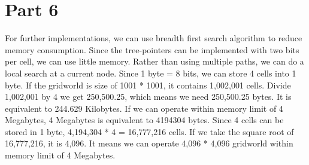 \documentclass{article}
\begin{document}
\section*{Part 6}
\hspace{5mm}
For further implementations, we can use breadth first search algorithm to reduce memory consumption. Since the tree-pointers can be implemented with two bits per cell, we can use little memory.  Rather than using multiple paths, we can do a local search at a current node. Since 1 byte = 8 bits, we can store 4 cells into 1 byte. If the gridworld is size of 1001 * 1001, it contains 1,002,001 cells. Divide 1,002,001 by 4 we get 250,500.25, which means we need 250,500.25 bytes. It is equivalent to 244.629 Kilobytes. If we can operate within memory limit of 4 Megabytes, 4 Megabytes is equivalent to 4194304 bytes. Since 4 cells can be stored in 1 byte, 4,194,304 * 4 = 16,777,216 cells. If we take the square root of 16,777,216, it is 4,096. It means we can operate 4,096 * 4,096 gridworld within memory limit of 4 Megabytes.
\end{document}
